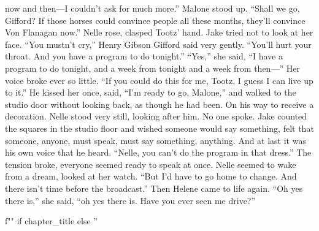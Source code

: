 \documentclass{novel}
\begin{document}
now and then—I couldn’t ask for much more.” Malone stood up. “Shall we go, Gifford? If those horses could convince people all these months, they’ll convince Von Flanagan now.” Nelle rose, clasped Tootz’ hand. Jake tried not to look at her face. “You mustn’t cry,” Henry Gibson Gifford said very gently. “You’ll hurt your throat. And you have a program to do tonight.” “Yes,” she said, “I have a program to do tonight, and a week from tonight and a week from then—” Her voice broke ever so little. “If you could do this for me, Tootz, I guess I can live up to it.” He kissed her once, said, “I’m ready to go, Malone,” and walked to the studio door without looking back, as though he had been. On his way to receive a decoration. Nelle stood very still, looking after him. No one spoke. Jake counted the squares in the studio floor and wished someone would say something, felt that someone, anyone, must speak, must say something, anything. And at last it was his own voice that he heard. “Nelle, you can’t do the program in that dress.” The tension broke, everyone seemed ready to speak at once. Nelle seemed to wake from a dream, looked at her watch. “But I’d have to go home to change. And there isn’t time before the broadcast.” Then Helene came to life again. “Oh yes there is,” she said, “oh yes there is. Have you ever seen me drive?”

\begin{ChapterStart}
\vspace{3\nbs}
f"" if chapter_title else ''
\end{ChapterStart}
\end{document}
